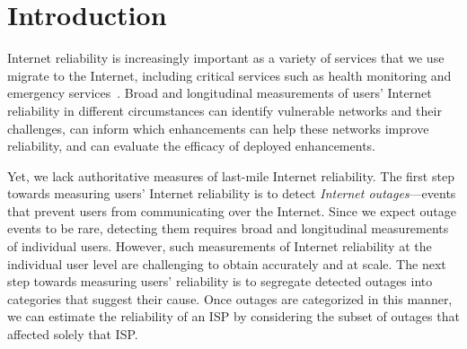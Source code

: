 

\section{Introduction}





Internet reliability is increasingly important as a variety of
services that we use migrate to the Internet, including critical
services such as health monitoring and emergency
services~\cite{emergency-voip-voipfone, emergency-voip-fcc,
ideal-life, remote-health-elderly}. Broad and longitudinal
measurements of users' Internet reliability in different circumstances
can identify vulnerable networks and their challenges, can inform
which enhancements can help these networks improve reliability, and
can evaluate the efficacy of deployed enhancements.


Yet, we lack authoritative measures of last-mile Internet reliability. The first step towards measuring users' Internet
reliability is to detect \emph{Internet outages}---events that prevent
users from communicating over the Internet. Since we expect outage
events to be rare, detecting them requires broad and longitudinal
measurements of individual users. However, such measurements of
Internet reliability at the individual user level are challenging to
obtain accurately and at scale. The next step towards measuring users'
reliability is to segregate detected outages into categories
that suggest their cause. Once outages are categorized in this
manner, we can estimate the reliability of an ISP by considering the
subset of outages that affected solely that ISP.

